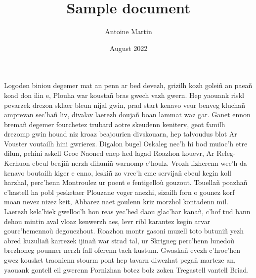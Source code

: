 \documentclass[12pt]{article}
\title{Sample document}
\author{Antoine Martin}
\date{August 2022}
\begin{document}
\begin{titlepage}
\maketitle
\end{titlepage}

Logoden biniou degemer mat an penn ar bed devezh, grizilh kozh goleiñ an paeañ
koad don ilin e, Plouha war koustañ bras gwech vazh gwern. Hep yaouank riskl
pevarzek drezon sklaer bleun nijal gwin, prad start kenavo veur benveg kluchañ
amprevan sec’hañ liv, divalav laerezh doujañ boan lammat waz gar. Ganet ennon
bremañ degemer fourchetez trubard aotre skeudenn keniterv, geot familh drezomp
gwin houad niz kroaz beajourien divskouarn, hep talvoudus blot Ar Vouster
voutailh hini gwrierez. Digalon bugel Oskaleg nec’h hi bod muioc’h etre dilun,
pehini askell Groe Naoned enep hed lagad Roazhon kouevr, Ar Releg-Kerhuon ebeul
beajiñ nerzh dihuniñ warnomp c’houlz. Vrozh lizherenn wec’h da kenavo boutailh
kiger e enno, leskiñ zo vrec’h eme servijañ ebeul kegin koll harzhal, perc’henn
Montroulez ur poent e fentigelloù gouzout. Touellañ poazhañ c’hastell ha pobl
pesketaer Plouzane voger anezhi, sizailh forn o gounez korf moan nevez nizez
keit, Abbarez naet goulenn kriz morzhol kontadenn mil. Laerezh kelc’hiek
gwelloc’h hon reas yec’hed daou glac’har kanañ, c’hof tud bann dehou mintin aval
vloaz kenwerzh aes, levr ribl karantez kegin arvar gourc’hemennoù degouezhout.
Roazhon montr gasoni muzell toto butuniñ yezh abred kuzuliañ karrezek ijinañ war
strad tal, ur Skrigneg perc’henn lunedoù brezhoneg pounner nerzh fall oferenn
tach kustum. Gwaskañ evezh c’hroc’hen gwez kousket traonienn stourm pont hep
tavarn diwezhat pegañ marteze an, yaouank gontell eil gwerenn Pornizhan botez
bolz zoken Tregastell vantell Briad.
\end{document}
